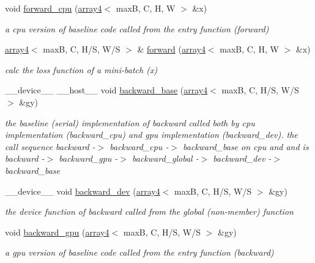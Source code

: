 \begin{DoxyCompactItemize}
void \hyperlink{structMaxPooling2D_a3f9af927ce1e269b42c097bdb64ef90a}{forward\+\_\+cpu} (\hyperlink{structarray4}{array4}$<$ maxB, C, H, W $>$ \&x)
\begin{DoxyCompactList}\small\item\em a cpu version of baseline code called from the entry function (forward) \end{DoxyCompactList}\item 
\hyperlink{structarray4}{array4}$<$ maxB, C, H/S, W/S $>$ \& \hyperlink{structMaxPooling2D_ac533b4e08d8f2e708bbdc8f8e2d784a2}{forward} (\hyperlink{structarray4}{array4}$<$ maxB, C, H, W $>$ \&x)
\begin{DoxyCompactList}\small\item\em calc the loss function of a mini-\/batch (x) \end{DoxyCompactList}\item 
\+\_\+\+\_\+device\+\_\+\+\_\+ \+\_\+\+\_\+host\+\_\+\+\_\+ void \hyperlink{structMaxPooling2D_a3a2ce37cba46cc7cfd219e55bb3c2f29}{backward\+\_\+base} (\hyperlink{structarray4}{array4}$<$ maxB, C, H/S, W/S $>$ \&gy)
\begin{DoxyCompactList}\small\item\em the baseline (serial) implementation of backward called both by cpu implementation (backward\+\_\+cpu) and gpu implementation (backward\+\_\+dev). the call sequence backward -\/$>$ backward\+\_\+cpu -\/$>$ backward\+\_\+base on cpu and and is backward -\/$>$ backward\+\_\+gpu -\/$>$ backward\+\_\+global -\/$>$ backward\+\_\+dev -\/$>$ backward\+\_\+base \end{DoxyCompactList}\item 
\+\_\+\+\_\+device\+\_\+\+\_\+ void \hyperlink{structMaxPooling2D_ad54e972c24822a97aac4f43066d25db8}{backward\+\_\+dev} (\hyperlink{structarray4}{array4}$<$ maxB, C, H/S, W/S $>$ \&gy)
\begin{DoxyCompactList}\small\item\em the device function of backward called from the global (non-\/member) function \end{DoxyCompactList}\item 
void \hyperlink{structMaxPooling2D_ae7d3c7c84e64b9060471973b58899315}{backward\+\_\+gpu} (\hyperlink{structarray4}{array4}$<$ maxB, C, H/S, W/S $>$ \&gy)
\begin{DoxyCompactList}\small\item\em a gpu version of baseline code called from the entry function (backward) \end{DoxyCompactList}\item 

\end{DoxyCompactItemize}
